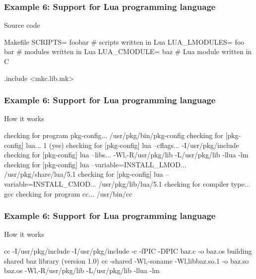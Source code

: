 \documentclass[hyperref={colorlinks=true}]{beamer}
\begin{document}
\begin{frame}[fragile]
  \frametitle{Example 6: Support for Lua programming language}

  \begin{block}{Source code}
  \begin{Code}{Makefile}
SCRIPTS=  foobar       # scripts written in Lua
LUA\_LMODULES=  foo bar # modules written in Lua
LUA\_CMODULE= baz       # Lua module written in C

.include <mkc.lib.mk>
  \end{Code}
  \end{block}
\end{frame}

\begin{frame}[fragile]
  \frametitle{Example 6: Support for Lua programming language}

  \begin{block}{How it works}
  \begin{CodeNoLabel}
checking for program pkg-config...
   /usr/pkg/bin/pkg-config
checking for [pkg-config] lua... 1 (yes)
checking for [pkg-config] lua --cflags...
   -I/usr/pkg/include
checking for [pkg-config] lua --libs...
   -Wl,-R/usr/pkg/lib -L/usr/pkg/lib -llua -lm
checking for [pkg-config] lua --variable=INSTALL_LMOD...
   /usr/pkg/share/lua/5.1
checking for [pkg-config] lua --variable=INSTALL_CMOD...
   /usr/pkg/lib/lua/5.1
checking for compiler type... gcc
checking for program cc... /usr/bin/cc
\prompt{\$}
  \end{CodeNoLabel}
  \end{block}
\end{frame}

\begin{frame}[fragile]
  \frametitle{Example 6: Support for Lua programming language}

  \begin{block}{How it works}
  \begin{CodeNoLabel}
cc    -I/usr/pkg/include  -I/usr/pkg/include -c
   -fPIC -DPIC baz.c -o baz.os
building shared baz library (version 1.0)
cc -shared -Wl,-soname -Wl,libbaz.so.1 -o baz.so  baz.os
   -Wl,-R/usr/pkg/lib -L/usr/pkg/lib -llua -lm
\prompt{\$}
  \end{CodeNoLabel}
  \end{block}
\end{frame}
\end{document}
